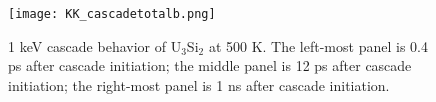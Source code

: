 \documentclass[review]{elsarticle}
\providecommand{\DIFdelbegin}{} %
\providecommand{\DIFdelend}{} %
\providecommand{\DIFaddbeginFL}{} %
\providecommand{\DIFaddendFL}{} %
\providecommand{\DIFdelbeginFL}{} %
\providecommand{\DIFdelendFL}{} %
\newcommand{\DIFscaledelfig}{0.5}
\newlength{\DIFdelgraphicswidth} %
\newlength{\DIFdelgraphicsheight} %
\newcommand{\DIFaddincludegraphics}[2][]{{\color{blue}\fbox{\DIFOincludegraphics[#1]{#2}}}} %
\newcommand{\DIFdelincludegraphics}[2][]{%
\sbox{\DIFdelgraphicsbox}{\DIFOincludegraphics[#1]{#2}}%
\settoboxwidth{\DIFdelgraphicswidth}{\DIFdelgraphicsbox} %
\settoboxtotalheight{\DIFdelgraphicsheight}{\DIFdelgraphicsbox} %
\scalebox{\DIFscaledelfig}{%
\parbox[b]{\DIFdelgraphicswidth}{\usebox{\DIFdelgraphicsbox}\\[-\baselineskip] \rule{\DIFdelgraphicswidth}{0em}}\llap{\resizebox{\DIFdelgraphicswidth}{\DIFdelgraphicsheight}{%
\setlength{\unitlength}{\DIFdelgraphicswidth}%
\begin{picture}(1,1)%
\thicklines\linethickness{2pt} %
{\color[rgb]{1,0,0}\put(0,0){\framebox(1,1){}}}%
{\color[rgb]{1,0,0}\put(0,0){\line( 1,1){1}}}%
{\color[rgb]{1,0,0}\put(0,1){\line(1,-1){1}}}%
\end{picture}%
}\hspace*{3pt}}} %
} %
\DeclareRobustCommand{\DIFdelbegin}{\DIFOdelbegin \let\includegraphics\DIFdelincludegraphics} %
\DeclareRobustCommand{\DIFdelend}{\DIFOaddend \let\includegraphics\DIFOincludegraphics} %
\DeclareRobustCommand{\DIFaddbeginFL}{\DIFOaddbeginFL \let\includegraphics\DIFaddincludegraphics} %
\DeclareRobustCommand{\DIFaddendFL}{\DIFOaddendFL \let\includegraphics\DIFOincludegraphics} %
\DeclareRobustCommand{\DIFdelbeginFL}{\DIFOdelbeginFL \let\includegraphics\DIFdelincludegraphics} %
\DeclareRobustCommand{\DIFdelendFL}{\DIFOaddendFL \let\includegraphics\DIFOincludegraphics} %
\begin{document}
\begin{figure}[bt]
	\centering
	\DIFdelbeginFL %
\DIFdelendFL \DIFaddbeginFL \texttt{[image: KK\_cascadetotalb.png]}
    \DIFaddendFL \caption{1 keV cascade behavior of U$_{3}$Si$_{2}$ at 500 K.  The left-most panel is 0.4 ps after cascade initiation; the middle panel is 12 ps after cascade initiation; the right-most panel is 1 ns after cascade initiation.}\label{fig:ben6}
\end{figure}

\DIFdelbegin %

\DIFdelend \FloatBarrier
\end{document}
